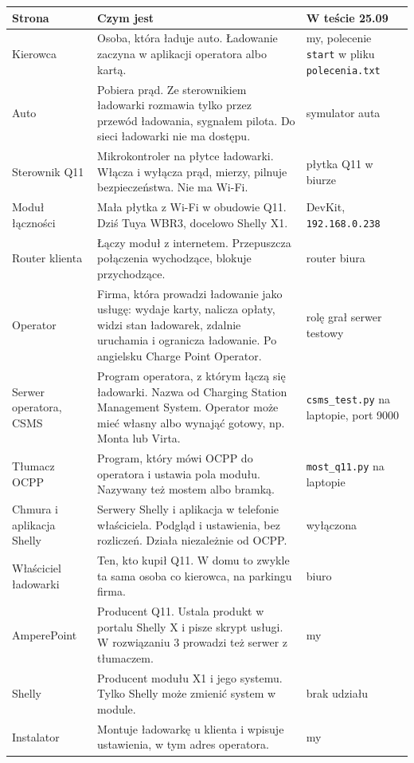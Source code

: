 \documentclass[11pt,a4paper]{article}
\begin{document}
\begin{longtable}{>{\raggedright\arraybackslash}p{3.00cm}>{\raggedright\arraybackslash}p{9.52cm}>{\raggedright\arraybackslash}p{2.76cm}}
\toprule
\rowcolor{apteallight}\textbf{Strona} & \textbf{Czym jest} & \textbf{W teście 25.09} \\
\midrule\endhead
\bottomrule\endfoot
Kierowca & Osoba, która ładuje auto. Ładowanie zaczyna w aplikacji operatora albo kartą. & my, polecenie \texttt{start} w pliku \texttt{polecenia.\allowbreak{}txt} \\
Auto & Pobiera prąd. Ze sterownikiem ładowarki rozmawia tylko przez przewód ładowania, sygnałem pilota. Do sieci ładowarki nie ma dostępu. & symulator auta \\
Sterownik Q11 & Mikrokontroler na płytce ładowarki. Włącza i wyłącza prąd, mierzy, pilnuje bezpieczeństwa. Nie ma Wi-Fi. & płytka Q11 w biurze \\
Moduł łączności & Mała płytka z Wi-Fi w obudowie Q11. Dziś Tuya WBR3, docelowo Shelly X1. & DevKit, \texttt{192.\allowbreak{}168.\allowbreak{}0.\allowbreak{}238} \\
Router klienta & Łączy moduł z internetem. Przepuszcza połączenia wychodzące, blokuje przychodzące. & router biura \\
Operator & Firma, która prowadzi ładowanie jako usługę: wydaje karty, nalicza opłaty, widzi stan ładowarek, zdalnie uruchamia i ogranicza ładowanie. Po angielsku Charge Point Operator. & rolę grał serwer testowy \\
Serwer operatora, CSMS & Program operatora, z którym łączą się ładowarki. Nazwa od Charging Station Management System. Operator może mieć własny albo wynająć gotowy, np. Monta lub Virta. & \texttt{csms\_test.py} na laptopie, port 9000 \\
Tłumacz OCPP & Program, który mówi OCPP do operatora i ustawia pola modułu. Nazywany też mostem albo bramką. & \texttt{most\_q11.py} na laptopie \\
Chmura i aplikacja Shelly & Serwery Shelly i aplikacja w telefonie właściciela. Podgląd i ustawienia, bez rozliczeń. Działa niezależnie od OCPP. & wyłączona \\
Właściciel ładowarki & Ten, kto kupił Q11. W domu to zwykle ta sama osoba co kierowca, na parkingu firma. & biuro \\
AmperePoint & Producent Q11. Ustala produkt w portalu Shelly X i pisze skrypt usługi. W rozwiązaniu 3 prowadzi też serwer z tłumaczem. & my \\
Shelly & Producent modułu X1 i jego systemu. Tylko Shelly może zmienić system w module. & brak udziału \\
Instalator & Montuje ładowarkę u klienta i wpisuje ustawienia, w tym adres operatora. & my \\
\end{longtable}
\end{document}
